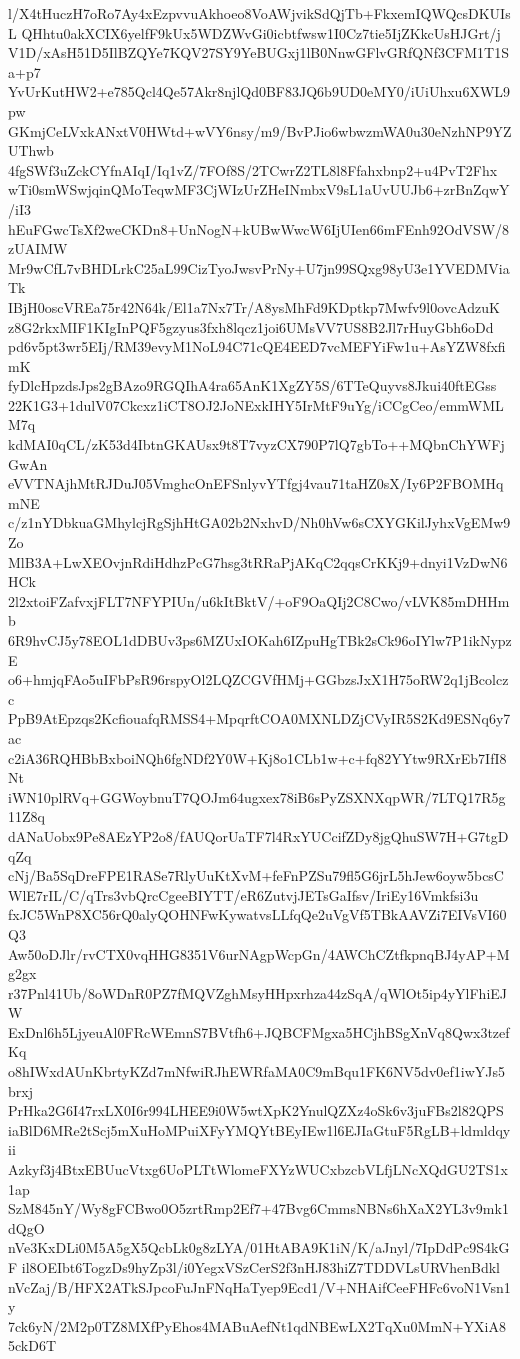 l/X4tHuczH7oRo7Ay4xEzpvvuAkhoeo8VoAWjvikSdQjTb+FkxemIQWQcsDKUIsL
QHhtu0akXCIX6yelfF9kUx5WDZWvGi0icbtfwsw1I0Cz7tie5IjZKkcUsHJGrt/j
V1D/xAsH51D5IlBZQYe7KQV27SY9YeBUGxj1lB0NnwGFlvGRfQNf3CFM1T1Sa+p7
YvUrKutHW2+e785Qcl4Qe57Akr8njlQd0BF83JQ6b9UD0eMY0/iUiUhxu6XWL9pw
GKmjCeLVxkANxtV0HWtd+wVY6nsy/m9/BvPJio6wbwzmWA0u30eNzhNP9YZUThwb
4fgSWf3uZckCYfnAIqI/Iq1vZ/7FOf8S/2TCwrZ2TL8l8Ffahxbnp2+u4PvT2Fhx
wTi0smWSwjqinQMoTeqwMF3CjWIzUrZHeINmbxV9sL1aUvUUJb6+zrBnZqwY/iI3
hEuFGwcTsXf2weCKDn8+UnNogN+kUBwWwcW6IjUIen66mFEnh92OdVSW/8zUAIMW
Mr9wCfL7vBHDLrkC25aL99CizTyoJwsvPrNy+U7jn99SQxg98yU3e1YVEDMViaTk
IBjH0oscVREa75r42N64k/El1a7Nx7Tr/A8ysMhFd9KDptkp7Mwfv9l0ovcAdzuK
z8G2rkxMIF1KIgInPQF5gzyus3fxh8lqcz1joi6UMsVV7US8B2Jl7rHuyGbh6oDd
pd6v5pt3wr5EIj/RM39evyM1NoL94C71cQE4EED7vcMEFYiFw1u+AsYZW8fxfimK
fyDlcHpzdsJps2gBAzo9RGQIhA4ra65AnK1XgZY5S/6TTeQuyvs8Jkui40ftEGss
22K1G3+1dulV07Ckcxz1iCT8OJ2JoNExkIHY5IrMtF9uYg/iCCgCeo/emmWMLM7q
kdMAI0qCL/zK53d4IbtnGKAUsx9t8T7vyzCX790P7lQ7gbTo++MQbnChYWFjGwAn
eVVTNAjhMtRJDuJ05VmghcOnEFSnlyvYTfgj4vau71taHZ0sX/Iy6P2FBOMHqmNE
c/z1nYDbkuaGMhylcjRgSjhHtGA02b2NxhvD/Nh0hVw6sCXYGKilJyhxVgEMw9Zo
MlB3A+LwXEOvjnRdiHdhzPcG7hsg3tRRaPjAKqC2qqsCrKKj9+dnyi1VzDwN6HCk
2l2xtoiFZafvxjFLT7NFYPIUn/u6kItBktV/+oF9OaQIj2C8Cwo/vLVK85mDHHmb
6R9hvCJ5y78EOL1dDBUv3ps6MZUxIOKah6IZpuHgTBk2sCk96oIYlw7P1ikNypzE
o6+hmjqFAo5uIFbPsR96rspyOl2LQZCGVfHMj+GGbzsJxX1H75oRW2q1jBcolczc
PpB9AtEpzqs2KcfiouafqRMSS4+MpqrftCOA0MXNLDZjCVyIR5S2Kd9ESNq6y7ac
c2iA36RQHBbBxboiNQh6fgNDf2Y0W+Kj8o1CLb1w+c+fq82YYtw9RXrEb7IfI8Nt
iWN10plRVq+GGWoybnuT7QOJm64ugxex78iB6sPyZSXNXqpWR/7LTQ17R5g11Z8q
dANaUobx9Pe8AEzYP2o8/fAUQorUaTF7l4RxYUCcifZDy8jgQhuSW7H+G7tgDqZq
cNj/Ba5SqDreFPE1RASe7RlyUuKtXvM+feFnPZSu79fl5G6jrL5hJew6oyw5bcsC
WlE7rIL/C/qTrs3vbQrcCgeeBIYTT/eR6ZutvjJETsGaIfsv/IriEy16Vmkfsi3u
fxJC5WnP8XC56rQ0alyQOHNFwKywatvsLLfqQe2uVgVf5TBkAAVZi7EIVsVI60Q3
Aw50oDJlr/rvCTX0vqHHG8351V6urNAgpWcpGn/4AWChCZtfkpnqBJ4yAP+Mg2gx
r37Pnl41Ub/8oWDnR0PZ7fMQVZghMsyHHpxrhza44zSqA/qWlOt5ip4yYlFhiEJW
ExDnl6h5LjyeuAl0FRcWEmnS7BVtfh6+JQBCFMgxa5HCjhBSgXnVq8Qwx3tzefKq
o8hIWxdAUnKbrtyKZd7mNfwiRJhEWRfaMA0C9mBqu1FK6NV5dv0ef1iwYJs5brxj
PrHka2G6I47rxLX0I6r994LHEE9i0W5wtXpK2YnulQZXz4oSk6v3juFBs2l82QPS
iaBlD6MRe2tScj5mXuHoMPuiXFyYMQYtBEyIEw1l6EJIaGtuF5RgLB+ldmldqyii
Azkyf3j4BtxEBUucVtxg6UoPLTtWlomeFXYzWUCxbzcbVLfjLNcXQdGU2TS1x1ap
SzM845nY/Wy8gFCBwo0O5zrtRmp2Ef7+47Bvg6CmmsNBNs6hXaX2YL3v9mk1dQgO
nVe3KxDLi0M5A5gX5QcbLk0g8zLYA/01HtABA9K1iN/K/aJnyl/7IpDdPc9S4kGF
il8OEIbt6TogzDs9hyZp3l/i0YegxVSzCerS2f3nHJ83hiZ7TDDVLsURVhenBdkl
nVcZaj/B/HFX2ATkSJpcoFuJnFNqHaTyep9Ecd1/V+NHAifCeeFHFc6voN1Vsn1y
7ck6yN/2M2p0TZ8MXfPyEhos4MABuAefNt1qdNBEwLX2TqXu0MmN+YXiA85ckD6T
